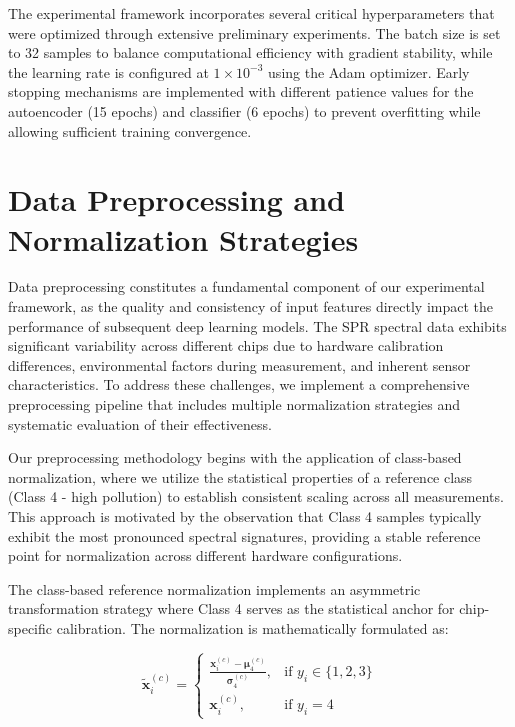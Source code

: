 The experimental framework incorporates several critical hyperparameters that were optimized through extensive preliminary experiments. The batch size is set to 32 samples to balance computational efficiency with gradient stability, while the learning rate is configured at $1 \times 10^{-3}$ using the Adam optimizer. Early stopping mechanisms are implemented with different patience values for the autoencoder (15 epochs) and classifier (6 epochs) to prevent overfitting while allowing sufficient training convergence.

\section{Data Preprocessing and Normalization Strategies}
\label{sec:data_preprocessing}

Data preprocessing constitutes a fundamental component of our experimental framework, as the quality and consistency of input features directly impact the performance of subsequent deep learning models. The SPR spectral data exhibits significant variability across different chips due to hardware calibration differences, environmental factors during measurement, and inherent sensor characteristics. To address these challenges, we implement a comprehensive preprocessing pipeline that includes multiple normalization strategies and systematic evaluation of their effectiveness.

Our preprocessing methodology begins with the application of class-based normalization, where we utilize the statistical properties of a reference class (Class 4 - high pollution) to establish consistent scaling across all measurements. This approach is motivated by the observation that Class 4 samples typically exhibit the most pronounced spectral signatures, providing a stable reference point for normalization across different hardware configurations.

The class-based reference normalization implements an asymmetric transformation strategy where Class 4 serves as the statistical anchor for chip-specific calibration. The normalization is mathematically formulated as:

\begin{equation}
\tilde{\mathbf{x}}^{(c)}_i = 
\begin{cases}
\displaystyle \frac{\mathbf{x}^{(c)}_i - \boldsymbol{\mu}^{(c)}_4}{\boldsymbol{\sigma}^{(c)}_4}, & \text{if } y_i \in \{1, 2, 3\} \\[0.3em]
\mathbf{x}^{(c)}_i, & \text{if } y_i = 4
\end{cases}
\label{eq:class_based_normalization}
\end{equation}

